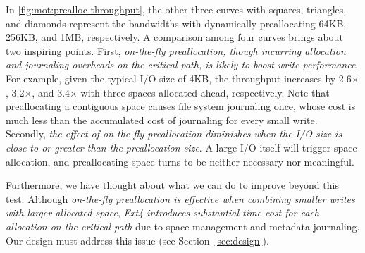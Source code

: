 In \autoref{fig:mot:prealloc-throughput},
the other 
three curves with squares, triangles, and diamonds represent the bandwidths
with dynamically preallocating 64KB, 256KB, and 1MB, respectively.
A comparison among four curves brings about two inspiring points.
First, {\em  on-the-fly preallocation, though incurring allocation and journaling overheads on the critical path, is likely to boost   write performance}.
For example, given the typical I/O size of 4KB, the throughput increases by 2.6$\times$, 3.2$\times$, and 3.4$\times$
with three spaces  allocated ahead, 
respectively. Note that 
preallocating a contiguous space causes file system  journaling once, whose cost
is much less than the accumulated cost of journaling for every small   write.
Secondly, {\em the effect of on-the-fly preallocation diminishes when the I/O size is close to or   greater
than the preallocation size}. A large I/O   itself will trigger   space allocation, and
preallocating space  turns to be neither necessary nor meaningful.

Furthermore, we have thought about what %
we can do to improve beyond this test. 
Although {\em on-the-fly preallocation is effective when combining smaller writes with larger allocated space}, 
{\em Ext4 introduces substantial time cost for each allocation on the critical path} due to  space management and metadata journaling.
Our design must address this issue (see Section~\ref{sec:design}).
%

